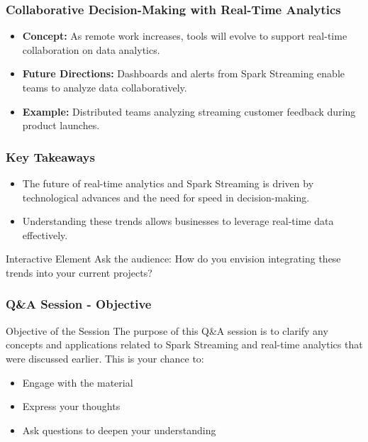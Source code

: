 \documentclass[aspectratio=169]{beamer}
\begin{document}
\begin{frame}[fragile]
    \frametitle{Collaborative Decision-Making with Real-Time Analytics}
    \begin{itemize}
        \item \textbf{Concept:} As remote work increases, tools will evolve to support real-time collaboration on data analytics.
        \item \textbf{Future Directions:} Dashboards and alerts from Spark Streaming enable teams to analyze data collaboratively.
        \item \textbf{Example:} Distributed teams analyzing streaming customer feedback during product launches.
    \end{itemize}
\end{frame}

\begin{frame}[fragile]
    \frametitle{Key Takeaways}
    \begin{itemize}
        \item The future of real-time analytics and Spark Streaming is driven by technological advances and the need for speed in decision-making.
        \item Understanding these trends allows businesses to leverage real-time data effectively.
    \end{itemize}

    \begin{block}{Interactive Element}
        Ask the audience: How do you envision integrating these trends into your current projects?
    \end{block}
\end{frame}

\begin{frame}[fragile]
    \frametitle{Q\&A Session - Objective}
    \begin{block}{Objective of the Session}
        The purpose of this Q\&A session is to clarify any concepts and applications related to Spark Streaming and real-time analytics that were discussed earlier. This is your chance to:
        \begin{itemize}
            \item Engage with the material
            \item Express your thoughts
            \item Ask questions to deepen your understanding
        \end{itemize}
    \end{block}
\end{frame}
\end{document}
